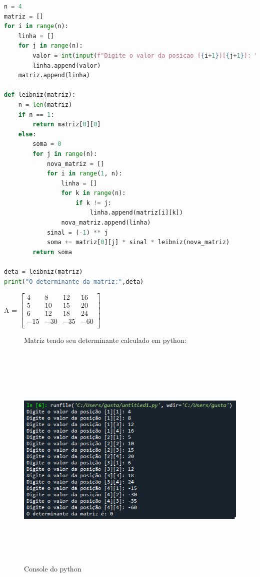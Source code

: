\documentclass[a4paper,12pt]{article}
\begin{document}
\begin{lstlisting}[language=python, caption=Código referente ao cálculo de determinantes]
n = 4
matriz = []
for i in range(n):
    linha = []
    for j in range(n):
        valor = int(input(f"Digite o valor da posicao [{i+1}][{j+1}]: "))
        linha.append(valor)
    matriz.append(linha)

def leibniz(matriz):
    n = len(matriz)
    if n == 1:
        return matriz[0][0]
    else:
        soma = 0
        for j in range(n):
            nova_matriz = []
            for i in range(1, n):
                linha = []
                for k in range(n):
                    if k != j:
                        linha.append(matriz[i][k])
                nova_matriz.append(linha)
            sinal = (-1) ** j
            soma += matriz[0][j] * sinal * leibniz(nova_matriz)
        return soma

deta = leibniz(matriz)
print("O determinante da matriz:",deta)
\end{lstlisting}
\pagebreak

A =
$
\left[\begin{array}{cccc}
	4 & 8 & 12 & 16\\
	5 & 10 & 15 & 20\\
	6 & 12 & 18 & 24\\
    -15 & -30 & -35 & -60\\
\end{array}\right]
$
\begin{figure}[h]
Matriz tendo seu determinante calculado em python:\\\\\\
    \centering
    \includegraphics[height=10cm,width=15cm]{console1.png}
    \caption{Console do python}
    \label{fig:my_label}
\end{figure}
\end{document}
